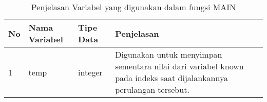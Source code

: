 \begin{table}[H]
	 	\caption{Penjelasan Variabel yang digunakan dalam fungsi MAIN}
		\begin{tabular}   {p{0.5cm}|p{2.5cm}|p{2cm}|p{4cm}|}\hline
		No&Nama Variabel&Tipe Data&Penjelasan \\ \hline
		1&temp&integer&Digunakan untuk menyimpan sementara nilai dari variabel known pada indeks saat dijalankannya perulangan tersebut. \\ \hline
		
		\end{tabular}%
		\label{tab:mainvar}
	\end{table}

